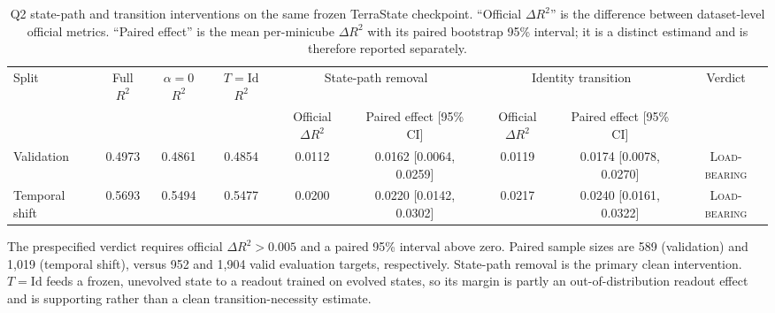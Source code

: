 \begin{table}[t]
\centering
\scriptsize
\caption{Q2 state-path and transition interventions on the same frozen
TerraState checkpoint. ``Official $\Delta R^2$'' is the difference between
dataset-level official metrics. ``Paired effect'' is the mean per-minicube
$\Delta R^2$ with its paired bootstrap 95\% interval; it is a distinct
estimand and is therefore reported separately.}
\label{tab:q2_load_bearing}
\begin{tabular}{lcccccccc}
\toprule
Split &
Full $R^2$ &
$\alpha{=}0$ $R^2$ &
$T{=}\mathrm{Id}$ $R^2$ &
\multicolumn{2}{c}{State-path removal} &
\multicolumn{2}{c}{Identity transition} &
Verdict \\
\cmidrule(lr){5-6}\cmidrule(lr){7-8}
& & & &
Official $\Delta R^2$ & Paired effect [95\% CI] &
Official $\Delta R^2$ & Paired effect [95\% CI] & \\
\midrule
Validation
& 0.4973 & 0.4861 & 0.4854
& 0.0112 & 0.0162 [0.0064, 0.0259]
& 0.0119 & 0.0174 [0.0078, 0.0270]
& \textsc{Load-bearing} \\
Temporal shift
& 0.5693 & 0.5494 & 0.5477
& 0.0200 & 0.0220 [0.0142, 0.0302]
& 0.0217 & 0.0240 [0.0161, 0.0322]
& \textsc{Load-bearing} \\
\bottomrule
\end{tabular}

\vspace{2pt}
\parbox{0.98\linewidth}{\footnotesize
The prespecified verdict requires official $\Delta R^2>0.005$ and a paired
95\% interval above zero. Paired sample sizes are 589 (validation) and 1,019
(temporal shift), versus 952 and 1,904 valid evaluation targets,
respectively. State-path removal is the primary clean intervention.
$T{=}\mathrm{Id}$ feeds a frozen, unevolved state to a readout trained on
evolved states, so its margin is partly an out-of-distribution readout effect
and is supporting rather than a clean transition-necessity estimate.}
\end{table}
